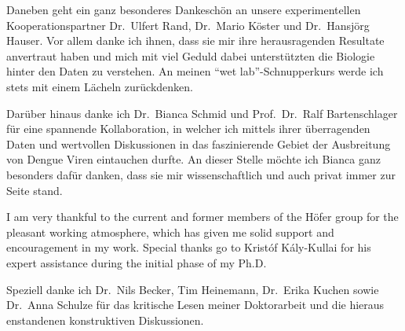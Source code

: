 Daneben geht ein ganz besonderes Dankesch\"{o}n an unsere experimentellen Kooperationspartner Dr.\ Ulfert Rand, Dr.\ Mario K\"{o}ster und Dr.\ Hansj\"{o}rg Hauser. Vor allem danke ich ihnen, dass sie mir ihre herausragenden Resultate anvertraut haben und mich mit viel Geduld dabei unterst\"{u}tzten die Biologie hinter den Daten zu verstehen. An meinen ``wet lab''-Schnupperkurs werde ich stets mit einem L\"{a}cheln zur\"{u}ckdenken. 

Dar\"{u}ber hinaus danke ich Dr.\ Bianca Schmid und Prof.\ Dr.\ Ralf Bartenschlager f\"{u}r eine spannende Kollaboration, in welcher ich mittels ihrer \"{u}berragenden Daten und wertvollen Diskussionen in das faszinierende Gebiet der Ausbreitung von Dengue Viren eintauchen durfte. An dieser Stelle m\"{o}chte ich Bianca ganz besonders daf\"{u}r danken, dass sie mir wissenschaftlich und auch privat immer zur Seite stand. 

I am very thankful to the current and former members of the H\"ofer group for the pleasant working atmosphere, which has given me solid support and encouragement in my work. Special thanks go to Krist\'{o}f K\'{a}ly-Kullai for his expert assistance during the initial phase of my Ph.D. 

Speziell danke ich Dr.\ Nils Becker, Tim Heinemann, Dr.\ Erika Kuchen sowie Dr.\ Anna Schulze f\"{u}r das kritische Lesen meiner Doktorarbeit und die hieraus enstandenen konstruktiven Diskussionen. 






%

%
%
%
%

